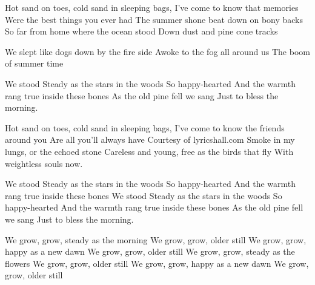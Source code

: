 \resetVars%
%
%
%
\MakeHeader%
\Lyrics%
Hot sand on toes, cold sand in sleeping bags,
I've come to know that memories
Were the best things you ever had
The summer shone beat down on bony backs
So far from home where the ocean stood
Down dust and pine cone tracks

We slept like dogs down by the fire side
Awoke to the fog all around us
The boom of summer time

We stood
Steady as the stars in the woods
So happy-hearted
And the warmth rang true inside these bones
As the old pine fell we sang
Just to bless the morning.

Hot sand on toes, cold sand in sleeping bags,
I've come to know the friends around you
Are all you'll always have
Courtesy of lyricshall.com
Smoke in my lungs, or the echoed stone
Careless and young, free as the birds that fly
With weightless souls now.

We stood
Steady as the stars in the woods
So happy-hearted
And the warmth rang true inside these bones
We stood
Steady as the stars in the woods
So happy-hearted
And the warmth rang true inside these bones
As the old pine fell we sang
Just to bless the morning.

We grow, grow, steady as the morning
We grow, grow, older still
We grow, grow, happy as a new dawn
We grow, grow, older still
We grow, grow, steady as the flowers
We grow, grow, older still
We grow, grow, happy as a new dawn
We grow, grow, older still\Next
